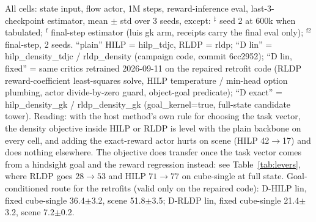 \begin{table}[t]
{\begin{tabular}{lrrrrrrrrr}
\bottomrule
\end{tabular}}
\par\vspace{2pt}
\begin{minipage}{\linewidth}\scriptsize\raggedright
All cells: state input, flow actor, 1M steps, reward-inference eval, last-3-checkpoint estimator, mean $\pm$ std over 3 seeds, except:
$^{\ddagger}$ seed 2 at 600k when tabulated; $^{\mathrm{f}}$ final-step estimator (luis gk arm, receipts carry the final eval only); $^{\mathrm{f}2}$ final-step, 2 seeds.
``plain'' HILP = hilp\_tdjc, RLDP = rldp; ``D lin'' = hilp\_density\_tdjc / rldp\_density (campaign code, commit 6cc2952); ``D lin, fixed'' = same critics retrained 2026-09-11 on the repaired retrofit code (RLDP reward-coefficient least-squares solve, HILP temperature / min-head option plumbing, actor divide-by-zero guard, object-goal predicate); ``D exact'' = hilp\_density\_gk / rldp\_density\_gk (goal\_kernel=true, full-state candidate tower).
Reading: with the host method's own rule for choosing the task vector, the density objective inside HILP or RLDP is level with the plain backbone on every cell, and adding the exact-reward actor hurts on scene (HILP 42$\to$17) and does nothing elsewhere. The objective does transfer once the task vector comes from a hindsight goal and the reward regression instead: see Table~\ref{tab:levers}, where RLDP goes $28\to53$ and HILP $71\to77$ on cube-single at full state.
Goal-conditioned route for the retrofits (valid only on the repaired code): D-HILP lin, fixed cube-single 36.4$\pm$3.2, scene 51.8$\pm$3.5; D-RLDP lin, fixed cube-single 21.4$\pm$3.2, scene 7.2$\pm$0.2.
\end{minipage}
\end{table}
